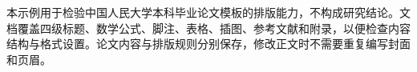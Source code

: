 本示例用于检验中国人民大学本科毕业论文模板的排版能力，不构成研究结论。文档覆盖四级标题、数学公式、脚注、表格、插图、参考文献和附录，以便检查内容结构与格式设置。论文内容与排版规则分别保存，修改正文时不需要重复编写封面和页眉。
